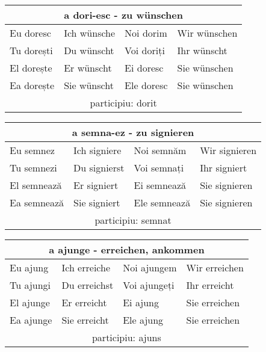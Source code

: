 \documentclass[11pt, oneside]{article}
\begin{document}
%
\begin{center}
  \begin{tabular}{ |p{3.25cm}|p{3.25cm}||p{3.25cm}|p{3.25cm}| }
      \hline
      \multicolumn{4}{|c|}{a dori-esc - zu wünschen} \\
      \hline
      \hline
      Eu doresc & Ich wünsche & Noi dorim & Wir wünschen\\
      \hline
      Tu dorești & Du wünscht & Voi doriți & Ihr wünscht\\
      \hline
      El dorește & Er wünscht & Ei doresc & Sie wünschen\\ 
      Ea dorește & Sie wünscht & Ele doresc & Sie wünschen\\
      \hline
      \multicolumn{4}{|c|}{participiu: dorit} \\
      \hline
     \end{tabular}
\end{center}
%
\begin{center}
  \begin{tabular}{ |p{3.25cm}|p{3.25cm}||p{3.25cm}|p{3.25cm}| }
      \hline
      \multicolumn{4}{|c|}{a semna-ez - zu signieren} \\
      \hline
      \hline
      Eu semnez & Ich signiere & Noi semnăm & Wir signieren\\
      \hline
      Tu semnezi & Du signierst & Voi semnați & Ihr signiert\\
      \hline
      El semnează & Er signiert & Ei semnează & Sie signieren\\ 
      Ea semnează & Sie signiert & Ele semnează & Sie signieren\\
      \hline
      \multicolumn{4}{|c|}{participiu: semnat} \\
      \hline
     \end{tabular}
\end{center}
%
\begin{center}
  \begin{tabular}{ |p{3.25cm}|p{3.25cm}||p{3.25cm}|p{3.25cm}| }
      \hline
      \multicolumn{4}{|c|}{a ajunge - erreichen, ankommen} \\
      \hline
      \hline
      Eu ajung & Ich erreiche & Noi ajungem & Wir erreichen\\
      \hline
      Tu ajungi & Du erreichst & Voi ajungeți & Ihr erreicht\\
      \hline
      El ajunge & Er erreicht & Ei ajung & Sie erreichen\\ 
      Ea ajunge & Sie erreicht & Ele ajung & Sie erreichen\\
      \hline
      \multicolumn{4}{|c|}{participiu: ajuns} \\
      \hline
     \end{tabular}
\end{center}
\end{document}
